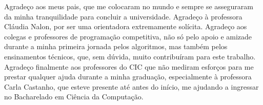 Agradeço aos meus pais, que me colocaram no mundo e sempre se asseguraram da minha tranquilidade para concluir a universidade. Agradeço à professora Cláudia Nalon, por ser uma orientadora extremamente solícita. Agradeço aos colegas e professores de programação competitiva, não só pelo apoio e amizade durante a minha primeira jornada pelos algoritmos, mas também pelos ensinamentos técnicos, que, sem dúvida, muito contribuíram para este trabalho. Agradeço finalmente aos professores do CIC que não mediram esforços para me prestar qualquer ajuda durante a minha graduação, especialmente à professora Carla Castanho, que esteve presente até antes do início, me ajudando a ingressar no Bacharelado em Ciência da Computação.